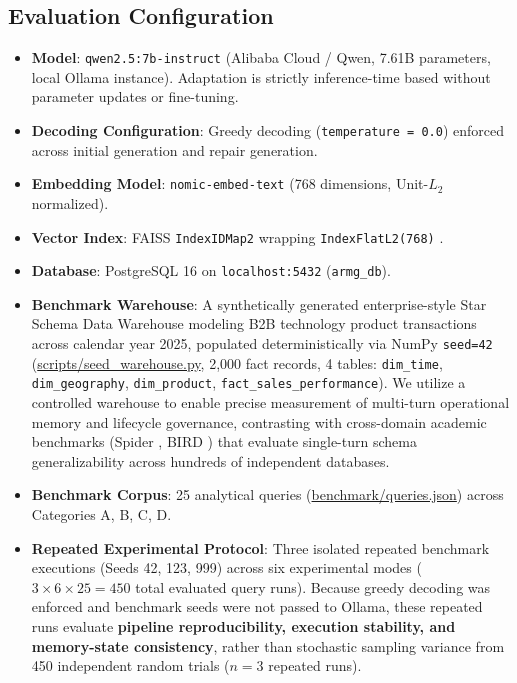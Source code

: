 \subsection{Evaluation Configuration}
\begin{itemize}
    \item \textbf{Model}: \texttt{qwen2.5:7b-instruct} \cite{qwen2024qwen25} (Alibaba Cloud / Qwen, 7.61B parameters, local Ollama instance). Adaptation is strictly inference-time based without parameter updates or fine-tuning.
    \item \textbf{Decoding Configuration}: Greedy decoding (\texttt{temperature = 0.0}) enforced across initial generation and repair generation.
    \item \textbf{Embedding Model}: \texttt{nomic-embed-text} \cite{nussbaum2024nomic} (768 dimensions, Unit-$L_2$ normalized).
    \item \textbf{Vector Index}: FAISS \texttt{IndexIDMap2} wrapping \texttt{IndexFlatL2(768)} \cite{johnson2021faiss}.
    \item \textbf{Database}: PostgreSQL 16 on \texttt{localhost:5432} (\texttt{armg\_db}).
    \item \textbf{Benchmark Warehouse}: A synthetically generated enterprise-style Star Schema Data Warehouse modeling B2B technology product transactions across calendar year 2025, populated deterministically via NumPy \texttt{seed=42} (\url{scripts/seed_warehouse.py}, 2,000 fact records, 4 tables: \texttt{dim\_time}, \allowbreak\texttt{dim\_geography}, \allowbreak\texttt{dim\_product}, \allowbreak\texttt{fact\_\allowbreak sales\_\allowbreak performance}). We utilize a controlled warehouse to enable precise measurement of multi-turn operational memory and lifecycle governance, contrasting with cross-domain academic benchmarks (Spider \cite{yu2018spider}, BIRD \cite{li2023bird}) that evaluate single-turn schema generalizability across hundreds of independent databases.
    \item \textbf{Benchmark Corpus}: 25 analytical queries (\url{benchmark/queries.json}) across Categories A, B, C, D.
    \item \textbf{Repeated Experimental Protocol}: Three isolated repeated benchmark executions (Seeds 42, 123, 999) across six experimental modes ($3 \times 6 \times 25 = 450$ total evaluated query runs). Because greedy decoding was enforced and benchmark seeds were not passed to Ollama, these repeated runs evaluate \textbf{pipeline reproducibility, execution stability, and memory-state consistency}, rather than stochastic sampling variance from 450 independent random trials ($n = 3$ repeated runs).
\end{itemize}


